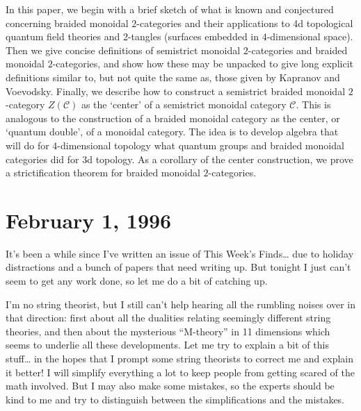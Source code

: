 \documentclass{article}
\def\tightlist{}
\renewcommand{\texttt}[1]{%
  \begingroup
  \ttfamily
  \begingroup\lccode`~=`/\lowercase{\endgroup\def~}{/\discretionary{}{}{}}%
  \begingroup\lccode`~=`[\lowercase{\endgroup\def~}{[\discretionary{}{}{}}%
  \begingroup\lccode`~=`.\lowercase{\endgroup\def~}{.\discretionary{}{}{}}%
  \catcode`/=\active\catcode`[=\active\catcode`.=\active
  \scantokens{#1\noexpand}%
  \endgroup
}
\begin{document}

In this paper, we begin with a brief sketch of what is known and
conjectured concerning braided monoidal \(2\)-categories and their
applications to 4d topological quantum field theories and 2-tangles
(surfaces embedded in \(4\)-dimensional space). Then we give concise
definitions of semistrict monoidal \(2\)-categories and braided monoidal
\(2\)-categories, and show how these may be unpacked to give long
explicit definitions similar to, but not quite the same as, those given
by Kapranov and Voevodsky. Finally, we describe how to construct a
semistrict braided monoidal \(2\)-category \(Z(\mathcal{C})\) as the
`center' of a semistrict monoidal category \(\mathcal{C}\). This is
analogous to the construction of a braided monoidal category as the
center, or `quantum double', of a monoidal category. The idea is to
develop algebra that will do for 4-dimensional topology what quantum
groups and braided monoidal categories did for 3d topology. As a
corollary of the center construction, we prove a strictification theorem
for braided monoidal \(2\)-categories.



\hypertarget{week72}{%
\section{February 1, 1996}\label{week72}}

It's been a while since I've written an issue of This Week's
Finds\ldots{} due to holiday distractions and a bunch of papers that
need writing up. But tonight I just can't seem to get any work done, so
let me do a bit of catching up.

I'm no string theorist, but I still can't help hearing all the rumbling
noises over in that direction: first about all the dualities relating
seemingly different string theories, and then about the mysterious
``M-theory'' in 11 dimensions which seems to underlie all these
developments. Let me try to explain a bit of this stuff\ldots{} in the
hopes that I prompt some string theorists to correct me and explain it
better! I will simplify everything a lot to keep people from getting
scared of the math involved. But I may also make some mistakes, so the
experts should be kind to me and try to distinguish between the
simplifications and the mistakes.
\end{document}
